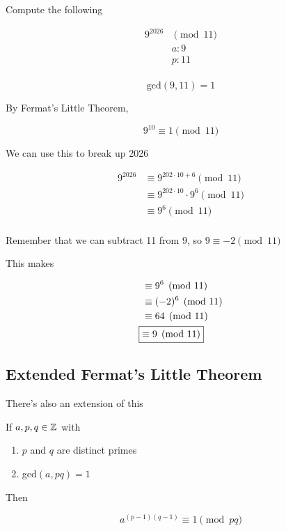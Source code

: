 \documentclass[../../Main.tex]{subfiles}
\begin{document}
\begin{example}
    Compute the following

    \begin{align*}
        9^{2026} &\pmod{11} \\
        &a: 9 \\
        &p: 11 \\
    \end{align*}

    $$\text{gcd}(9, 11) = 1$$

    By Fermat's Little Theorem,

    $$9^{10} \equiv 1 \pmod{11}$$

    We can use this to break up 2026

    \begin{align*}
        9^{2026} &\equiv 9^{202 \cdot 10 + 6} \pmod{11} \\
        &\equiv 9^{202 \cdot 10} \cdot 9^6 \pmod{11} \\
        &\equiv 9^6 \pmod{11} \\
    \end{align*}

    Remember that we can subtract 11 from 9, so $9 \equiv -2 \pmod{11}$

    This makes

    \begin{align*}
        &\equiv 9^6 \pmod{11} \\
        &\equiv (-2)^6 \pmod{11} \\
        &\equiv 64 \pmod{11} \\
        \Aboxed{&\equiv 9 \pmod{11}}
    \end{align*}


\end{example}

\subsection{Extended Fermat's Little Theorem}

There's also an extension of this

\begin{theorem}
    If $a, p, q \in \mathbb{Z}$ with
    
    \begin{enumerate}
        \item $p$ and $q$ are distinct primes
        \item gcd$(a, pq) = 1$
    \end{enumerate}

    Then

    $$a^{(p-1)(q-1)} \equiv 1 \pmod{pq}$$
\end{theorem}
\end{document}
